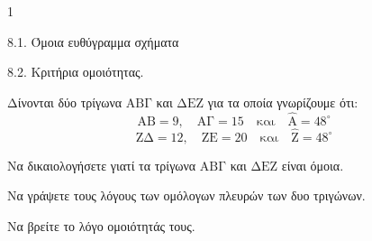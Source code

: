 \begin{ylh}{1}
    \item 8.1. Όμοια ευθύγραμμα σχήματα
    \item 8.2. Κριτήρια ομοιότητας.
\end{ylh}
Δίνονται δύο τρίγωνα $\mathrm{ΑΒΓ}$ και $\mathrm{ΔΕΖ}$ για τα οποία γνωρίζουμε ότι:
\[ \mathrm{AB} = 9, \quad \mathrm{A\Gamma} = 15 \quad \text{και} \quad \hat{\mathrm{A}} = 48^\circ \]
\[ \mathrm{Z\Delta} = 12, \quad \mathrm{ZE} = 20 \quad \text{και} \quad \hat{\mathrm{Z}} = 48^\circ \]
\begin{alist}
\item Να δικαιολογήσετε γιατί τα τρίγωνα $\mathrm{ΑΒΓ}$ και $\mathrm{ΔΕΖ}$ είναι όμοια. 
\item
    \begin{rlist}
    \item Να γράψετε τους λόγους των ομόλογων πλευρών των δυο τριγώνων.
    \item Να βρείτε το λόγο ομοιότητάς τους. 
    \end{rlist}
\end{alist}